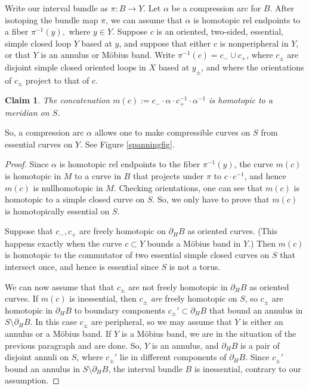 \documentclass[12pt]{amsart}
\newtheorem{claim}[theorem]{Claim}
\theoremstyle{definition}
\theoremstyle{remark}
\begin{document}
Write our interval bundle as $\pi : B \longrightarrow Y$. Let $\alpha$ be a compression arc for $B$. After isotoping the bundle map $\pi$, we can assume that $\alpha$ is homotopic rel endpoints to a fiber $\pi^{-1}(y),$ where $y\in Y.$ Suppose $c$ is an oriented, two-sided, essential, simple closed loop $Y$ based at $y$, and suppose that either $c$ is nonperipheral in $Y$, or that $Y$ is an annulus or M\"obius band. Write $\pi^{-1}(c)=c_-\cup c_+$, where $c_\pm$ are disjoint simple closed oriented loops in $X$ based at $y_\pm$, and where the orientations of $c_\pm$ project to that of $c$.

\begin{claim}\label{mc}
The concatenation $m(c):=c_- \cdot \alpha \cdot c_+^{-1} \cdot \alpha^{-1}$ is homotopic to a meridian on $S$.
\end{claim}

So, a compression arc $\alpha$ allows one to make compressible curves on $S$ from essential curves on $Y$. See Figure \ref{spanningfig}.

\begin{proof}
Since $\alpha$ is homotopic rel endpoints to the fiber $\pi^{-1}(y)$, the curve $m(c)$ is homotopic in $M$ to a curve in $B$ that projects under $\pi$ to $c \cdot c^{-1}$, and hence $m(c)$ is nullhomotopic in $M$. Checking orientations, one can see that $m(c)$ is homotopic to a simple closed curve on $S$.  So, we only have to prove that $m(c)$ is homotopically essential on $S$. 



Suppose that $c_-,c_+$ are freely homotopic on $\partial_H B$ as oriented curves. (This happens exactly when the curve $c \subset Y$ bounds a M\"obius band in $Y$.) Then $m(c)$ is homotopic to the commutator of two essential simple closed curves on $S$ that intersect once, and hence is essential since $S$ is not a torus.

We can now assume that that $c_\pm$ are not freely homotopic in $\partial_H B$ as oriented curves. If $m(c)$ is inessential, then $c_\pm$ \emph{are} freely homotopic on $S$, so $c_\pm$ are homotopic in $\partial_H B$ to boundary components $c_\pm' \subset \partial_H B$ that bound an annulus in $S \setminus \partial_HB$. In this case $c_\pm$ are peripheral, so we may assume that $Y$ is either an annulus or a M\"obius band. If $Y$ is a M\"obius band, we are in the situation of the previous paragraph and are done. So, $Y$ is an annulus, and $\partial_HB$ is a pair of disjoint annuli on $S$, where $c_\pm'$ lie in different components of $\partial_HB$. Since $c_\pm'$ bound an annulus in $S\setminus \partial_HB$, the interval bundle $B$ is inessential, contrary to our assumption.
\end{proof}
\end{document}
